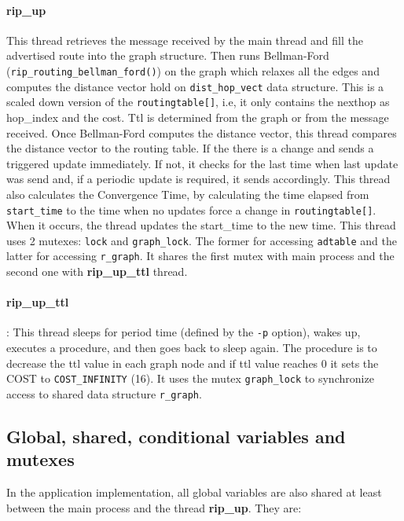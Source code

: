 \documentclass[10pt]{extarticle}
\begin{document}
\paragraph{rip\_up}  This thread  retrieves the  message received  by the  main
thread  and fill  the  advertised  route into  the  graph  structure. Then  runs
Bellman-Ford (\texttt{rip\_routing\_bellman\_ford()}) on the graph which relaxes
all the edges and computes  the distance vector hold on \texttt{dist\_hop\_vect}
data  structure.   This is  a   scaled  down  version   of  the
\texttt{routingtable[]}, i.e, it only contains the nexthop as hop\_index and the
cost.   Ttl is  determined from  the graph  or from  the message  received. Once
Bellman-Ford computes  the distance  vector, this  thread compares  the distance
vector to  the routing  table. If  the there is  a change  and sends  a triggered
update immediately.  If not, it  checks for the last  time when last  update was
send and,  if a periodic update  is required, it sends  accordingly. This thread
also  calculates the  Convergence Time,  by  calculating the  time elapsed  from
\texttt{start\_time}  to   the  time   when  no  updates   force  a   change  in
\texttt{routingtable[]}. When it  occurs, the thread updates  the start\_time to
the new time. This thread uses 2 mutexes: \texttt{lock} and \texttt{graph\_lock}.
The  former  for  accessing  \texttt{adtable}   and  the  latter  for  accessing
\texttt{r\_graph}. It shares the first mutex with main process and the second one
with \textbf{rip\_up\_ttl} thread.

\paragraph{rip\_up\_ttl}: This thread sleeps for period time (defined by the
\texttt{-p} option), wakes up, executes a procedure, and then goes back to sleep
again. The procedure is to decrease the ttl value in each graph node and if ttl
value reaches 0 it sets the COST to \texttt{COST\_INFINITY} (16). 
It uses the mutex \texttt{graph\_lock} to synchronize access to shared data
structure \texttt{r\_graph}.

\subsection{Global, shared, conditional variables and mutexes}

In the application implementation, all global variables are also shared at least
between the main process and the thread \textbf{rip\_up}. They are:
\end{document}
